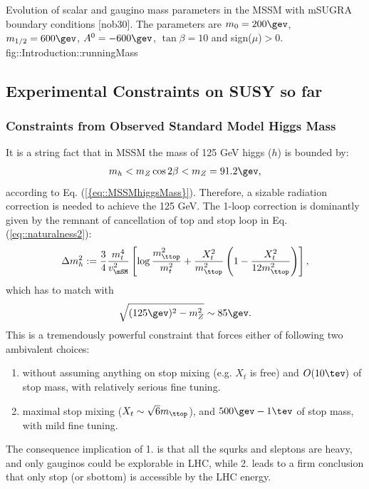 {Evolution of scalar and gaugino mass parameters in the MSSM with mSUGRA boundary conditions [nob30]. The parameters are $m_0=200 \gev$, $m_{1/2}=600 \gev$, $A^0=-600\gev$, $\tan{\beta}=10$ and sign($\mu$)$>0$.}
{fig::Introduction::runningMass}



\subsection{Experimental Constraints on SUSY so far} 
\subsubsection{Constraints from Observed Standard Model Higgs Mass}
It is a string fact that in MSSM the mass of 125 GeV higgs ($h$) is bounded by:
\begin{align}
m_{h} < m_Z \cos{2\beta} < m_Z = 91.2 \gev,
\end{align}
according to Eq. (\ref{{eq::MSSMhiggsMass}}).
Therefore, a sizable radiation correction is needed to achieve the 125 GeV.
The 1-loop correction is dominantly given by the remnant of cancellation of top and stop loop in Eq. (\ref{eq::naturalness2}):
\begin{align}
\Delta m_h^2 := \frac{3}{4} \frac{m_t^4}{v_{\mSM}^2} \left[ \log{\frac{m_{\ttop}^2}{m_t^2}} + \frac{X_t^2}{m_{\ttop}^2} \left(1-\frac{X_t^2}{12m_{\ttop}^2} \right)  \right],
\end{align}
which has to match with 
\begin{align}
\sqrt{(125\gev)^2 - m_Z^2} \sim 85\gev.
\end{align}
This is a tremendously powerful constraint that forces either of following two ambivalent choices:
\begin{enumerate}
\item without assuming anything on stop mixing (e.g. $X_t$ is free) and $O(10\tev)$ of stop mass, with relatively serious fine tuning.
\item maximal stop mixing ($X_t \sim \sqrt{6}m_{\ttop}$), and $500\gev-1\tev$ of stop mass, with mild fine tuning.
\end{enumerate}
The consequence implication of 1. is that all the squrks and sleptons are heavy, and only gauginos could be explorable in LHC,
while 2. leads to a firm conclusion that only stop (or sbottom) is accessible by the LHC energy.

